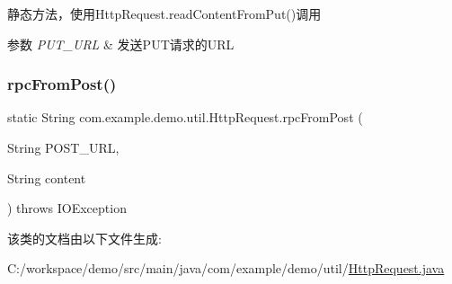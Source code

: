 静态方法，使用\+Http\+Request.\+read\+Content\+From\+Put()调用 
\begin{DoxyParams}{参数}
{\em P\+U\+T\+\_\+\+U\+RL} & 发送\+P\+U\+T请求的\+U\+RL \\
\hline
\end{DoxyParams}
\mbox{\label{classcom_1_1example_1_1demo_1_1util_1_1_http_request_a15430f22e99a4b934e71c3cd8c348b8e}} 
\subsubsection{\texorpdfstring{rpc\+From\+Post()}{rpcFromPost()}}
{\footnotesize\ttfamily static String com.\+example.\+demo.\+util.\+Http\+Request.\+rpc\+From\+Post (\begin{DoxyParamCaption}\item[{String}]{P\+O\+S\+T\+\_\+\+U\+RL,  }\item[{String}]{content }\end{DoxyParamCaption}) throws I\+O\+Exception\hspace{0.3cm}{\ttfamily [static]}}



该类的文档由以下文件生成\+:\begin{DoxyCompactItemize}
\item 
C\+:/workspace/demo/src/main/java/com/example/demo/util/\mbox{\hyperlink{_http_request_8java}{Http\+Request.\+java}}\end{DoxyCompactItemize}

